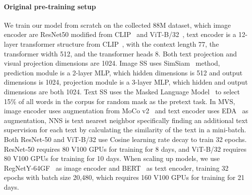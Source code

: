 \paragraph{Original pre-training setup}

We train our \workname model from scratch on the collected 88M dataset, which image encoder are ResNet50 modified from CLIP~\citep{radford2021learning} and ViT-B/32~\citep{dosovitskiy2020image}, text encoder is a 12-layer transformer structure from CLIP~\citep{radford2021learning}, with the context length 77, the transformer width 512, and the transformer heads 8.  Both text projection and visual projection dimensions are 1024. Image SS uses SimSiam~\citep{chen2021exploring} method, prediction module is a 2-layer MLP, which hidden dimensions is 512 and output dimensions is 1024, projection module  is a 3-layer MLP, which hidden and output dimensions are both 1024. Text SS uses the Masked Language Model~\citep{devlin2018bert} to select 15\% of all words in the corpus for random mask as the pretext task. In MVS, image encoder uses augmentation from MoCo v2~\citep{chen2020improved} and text encoder uses EDA~\citep{wei2019eda} as augmentation, NNS is text nearest neighbor specifically finding an additional text supervision for each text by calculating the similarity of the text in a mini-batch. 
Both ResNet-50 and ViT-B/32 use Cosine learning rate decay to train 32 epochs. 
ResNet-50 requires 80 V100 GPUs for training for 8 days, and ViT-B/32 requires 80 V100 GPUs for training for 10 days. When scaling up models, we use RegNetY-64GF~\citep{2020Designing,goyal2021self} as image encoder and BERT~\citep{devlin2018bert} as text encoder, training 32 epochs with batch size 20,480, which requires 160 V100 GPUs for training for 21 days.




